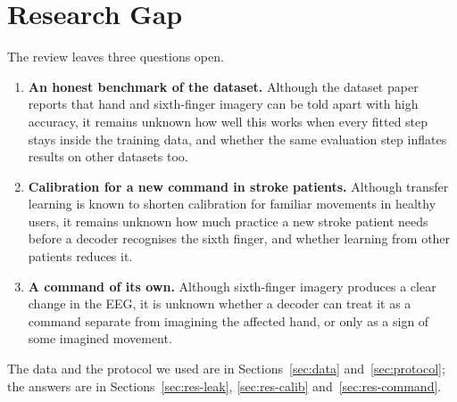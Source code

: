 \section{Research Gap}\label{sec:lit-gap}

The review leaves three questions open.

\begin{enumerate}
  \item \textbf{An honest benchmark of the dataset.} Although the dataset paper reports that
        hand and sixth-finger imagery can be told apart with high accuracy, it remains unknown
        how well this works when every fitted step stays inside the training data, and
        whether the same evaluation step inflates results on other datasets too.
  \item \textbf{Calibration for a new command in stroke patients.} Although transfer learning
        is known to shorten calibration for familiar movements in healthy users, it remains
        unknown how much practice a new stroke patient needs before a decoder recognises the
        sixth finger, and whether learning from other patients reduces it.
  \item \textbf{A command of its own.} Although sixth-finger imagery produces a clear change in
        the EEG, it is unknown whether a decoder can treat it as a command separate from
        imagining the affected hand, or only as a sign of some imagined movement.
\end{enumerate}

The data and the protocol we used are in Sections~\ref{sec:data} and~\ref{sec:protocol}; the
answers are in Sections~\ref{sec:res-leak}, \ref{sec:res-calib} and~\ref{sec:res-command}.
